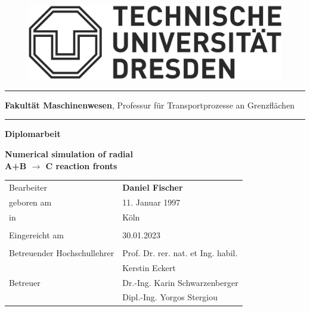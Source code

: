 \documentclass[../thesis.tex]{subfiles}
\begin{document}
\begin{titlepage}
	\begin{addmargin}[22mm]{0mm}
		\begin{figure}[t]
			\hspace*{5mm}\includegraphics[scale=0.35]{figs/Logo.png} \vspace{-8mm}
		\end{figure}
		\rule{140mm}{.4pt}
		\vspace{0.4mm}

		\scriptsize { {\bfseries Fakultät Maschinenwesen},
			Professur für Transportprozesse an Grenzflächen}
		\vspace{-1.4mm}

		\rule{140mm}{.4pt}
		\vspace{2cm}

		{\Large \bfseries Diplomarbeit}
		\vspace{2cm}

		{\LARGE \bfseries Numerical simulation of radial \\ A+B $\rightarrow$ C reaction fronts \par}
		\vspace{2cm}
		\begin{addmargin}[-2mm]{0mm}
			\large
			\begin{tabular}{l l}
			  Bearbeiter                   & {\bfseries Daniel Fischer} \\
			  geboren am                   & 11. Januar 1997 \\
			  in                           & Köln \\ \\
			  Eingereicht am               & 30.01.2023 \\ \\
			  Betreuender Hochschullehrer  & Prof. Dr. rer. nat. et Ing. habil. \\ 
			  							   & Kerstin Eckert \\
			  Betreuer                     & Dr.-Ing. Karin Schwarzenberger  \\
			  							   & Dipl.-Ing. Yorgos Stergiou \\

			\end{tabular}
		\end{addmargin}
	\end{addmargin}
\end{titlepage}
\end{document}
